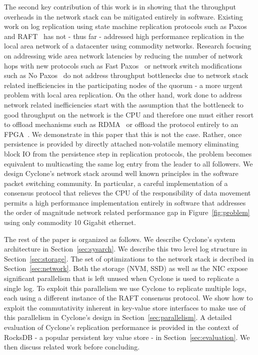 \documentclass[pageno]{jpaper}
\begin{document}
The second key contribution of this work is in showing that the throughput
overheads in the network stack can be mitigated entirely in software. Existing
work on log replication using state machine replication protocols such as
Paxos~\cite{paxos} and RAFT~\cite{raft} has not - thus far - addressed high
performance replication in the local area network of a datacenter using
commodity networks.  Research focusing on addressing wide area network latencies
by reducing the number of network hops with new protocols such as Fast
Paxos~\cite{fast-paxos} or network switch modifications such as No
Paxos~\cite{nopaxos} do not address throughput bottlenecks due to network stack
related inefficiencies in the participating nodes of the quorum - a more urgent
problem with local area replication. On the other hand, work done to address
network related inefficiencies start with the assumption that the bottleneck to
good throughput on the network is the CPU and therefore one must either resort
to offload mechanisms such as RDMA~\cite{dare, farm, faast} or offload the
protocol entirely to an FPGA~\cite{consensus_box}. We demonstrate in this paper
that this is not the case. Rather, once persistence is provided by directly
attached non-volatile memory eliminating block IO from the persistence step in
replication protocols, the problem becomes equivalent to multicasting the same
log entry from the leader to all followers. We design Cyclone's network stack
around well known principles in the software packet switching community. In
particular, a careful implementation of a consensus protocol that relieves the
CPU of the responsibility of data movement permits a high performance
implementation entirely in software that addresses the order of magnitude
network related performance gap in Figure~\ref{fig:problem} using only commodity
10 Gigabit ethernet.

The rest of the paper is organized as follows. We describe Cyclone's system
architecture in Section~\ref{sec:sysarch}. We describe this two level log
structure in Section~\ref{sec:storage}. The set of optimizations to the network
stack is decribed in Section~\ref{sec:network}. Both the storage (NVM, SSD) as
well as the NIC expose significant parallelism that is left unused when Cyclone
is used to replicate a single log. To exploit this parallelism we use Cyclone to
replicate multiple logs, each using a different instance of the RAFT consensus
protocol. We show how to exploit the commutativity inherent in key-value store
interfaces to make use of this parallelism in Cyclone's design in
Section~\ref{sec:parallelism}.  A detailed evaluation of Cyclone's replication
performance is provided in the context of RocksDB - a popular persistent key
value store - in Section~\ref{sec:evaluation}. We then discuss related work
before concluding.
\end{document}
